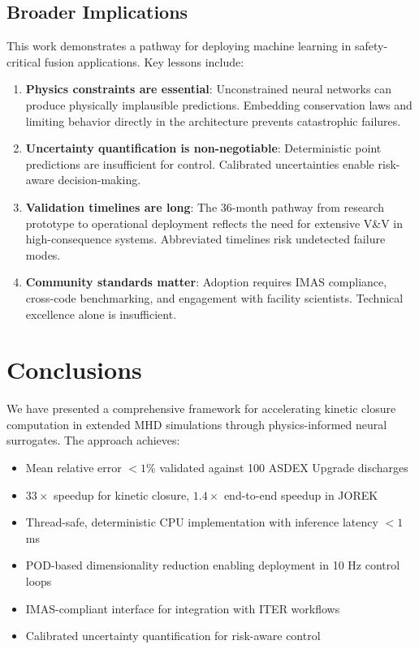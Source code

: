 \documentclass[12pt]{article}
\begin{document}
\subsection{Broader Implications}

This work demonstrates a pathway for deploying machine learning in safety-critical fusion applications. Key lessons include:

\begin{enumerate}
\item \textbf{Physics constraints are essential}: Unconstrained neural networks can produce physically implausible predictions. Embedding conservation laws and limiting behavior directly in the architecture prevents catastrophic failures.

\item \textbf{Uncertainty quantification is non-negotiable}: Deterministic point predictions are insufficient for control. Calibrated uncertainties enable risk-aware decision-making.

\item \textbf{Validation timelines are long}: The 36-month pathway from research prototype to operational deployment reflects the need for extensive V\&V in high-consequence systems. Abbreviated timelines risk undetected failure modes.

\item \textbf{Community standards matter}: Adoption requires IMAS compliance, cross-code benchmarking, and engagement with facility scientists. Technical excellence alone is insufficient.
\end{enumerate}

\section{Conclusions}
\label{sec:conclusions}

We have presented a comprehensive framework for accelerating kinetic closure computation in extended MHD simulations through physics-informed neural surrogates. The approach achieves:

\begin{itemize}
\item Mean relative error $< 1\%$ validated against 100 ASDEX Upgrade discharges
\item $33\times$ speedup for kinetic closure, $1.4\times$ end-to-end speedup in JOREK
\item Thread-safe, deterministic CPU implementation with inference latency $< 1$ ms
\item POD-based dimensionality reduction enabling deployment in 10 Hz control loops
\item IMAS-compliant interface for integration with ITER workflows
\item Calibrated uncertainty quantification for risk-aware control
\end{itemize}
\end{document}
